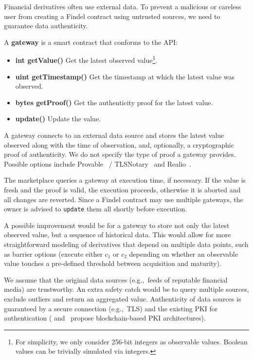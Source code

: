 Financial derivatives often use external data.
To prevent a malicious or careless user from creating a Findel contract using untrusted sources, we need to guarantee data authenticity.

\begin{definition}
	A \textbf{gateway} is a smart contract that conforms to the API:
	
	\begin{itemize}
		\item \textbf{int getValue()} Get the latest observed value\footnote{For simplicity, we only consider 256-bit integers as observable values. Boolean values can be trivially simulated via integers.}.
		\item \textbf{uint getTimestamp()} Get the timestamp at which the latest value was observed.
		\item \textbf{bytes getProof()} Get the authenticity proof for the latest value.
		\item \textbf{update()} Update the value.
	\end{itemize}
	
\end{definition}

A gateway connects to an external data source and stores the latest value observed along with the time of observation, and, optionally, a cryptographic proof of authenticity.
We do not specify the type of proof a gateway provides.
Possible options include Provable~\cite{Provable} / TLSNotary~\cite{TLSNotary} and Realio~\cite{Realitio}.

The marketplace queries a gateway at execution time, if necessary. 
If the value is fresh and the proof is valid, the execution proceeds, otherwise it is aborted and all changes are reverted.
Since a Findel contract may use multiple gateways, the owner is advised to \texttt{update} them all shortly before execution.

A possible improvement would be for a gateway to store not only the latest observed value, but a sequence of historical data.
This would allow for more straightforward modeling of derivatives that depend on multiple data points, such as barrier options (execute either \(c_1\) or \(c_2\) depending on whether an observable value touches a pre-defined threshold between acquisition and maturity).

We assume that the original data sources (e.g.,~feeds of reputable financial media) are trustworthy.
An extra safety catch would be to query multiple sources, exclude outliers and return an aggregated value.
Authenticity of data sources is guaranteed by a secure connection (e.g.,~TLS) and the existing PKI for authentication (\cite{Fromknecht2014} and~\cite{Lewison2016} propose blockchain-based PKI architectures).

